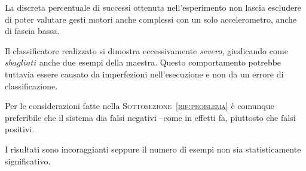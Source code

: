La discreta percentuale di successi ottenuta nell'esperimento
non lascia escludere di poter valutare gesti motori anche complessi
con un solo accelerometro, anche di fascia bassa.

Il classificatore realizzato si dimostra eccessivamente \emph{severo},
giudicando come $sbagliati$ anche due esempi della maestra.
Questo comportamento potrebbe tuttavia essere causato da imperfezioni
nell'esecuzione e non da un errore di classificazione.

Per le considerazioni fatte nella \textsc{Sottosezione~\ref{rif:problema}}
è comunque preferibile che il sistema dia falsi negativi --come in effetti fa,
piuttosto che falsi positivi.

I risultati sono incoraggianti 
seppure il numero di esempi non sia statisticamente significativo.
